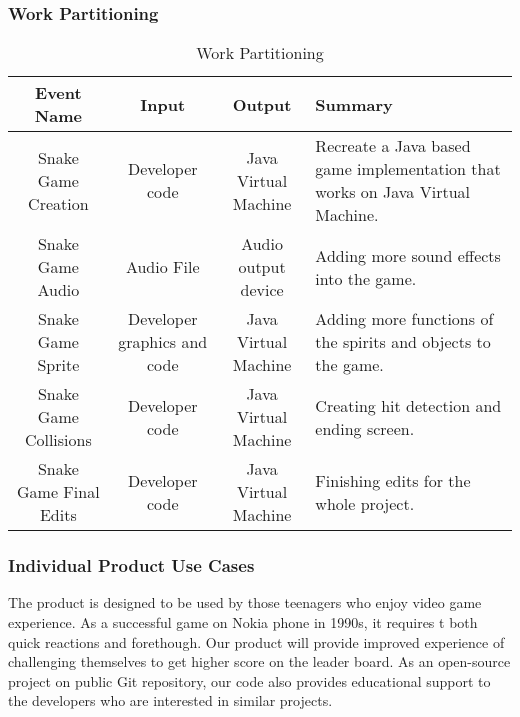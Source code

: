 \documentclass[12pt, titlepage]{article}
\begin{document}
\subsubsection{Work Partitioning}
	\begin{table}[H]
	\caption{Work Partitioning}
        \begin{adjustwidth}{-2.75cm}{}
    \begin{tabular}{|c|c|c|p{5cm}|}
    \hline
    Event Name & Input & Output & Summary\\
    \hline
    Snake Game Creation & Developer code & Java Virtual Machine & Recreate a Java based game implementation that works on Java Virtual Machine.\\
    \hline
    Snake Game Audio & Audio File & Audio output device & Adding more sound effects into the game.\\
    \hline
    Snake Game Sprite & Developer graphics and code & Java Virtual Machine & Adding more functions of the spirits and objects to the game.\\
    \hline
    Snake Game Collisions & Developer code & Java Virtual Machine & Creating hit detection and ending screen. \\
    \hline
    Snake Game Final Edits & Developer code & Java Virtual Machine & Finishing edits for the whole project.\\
    \hline
    \end{tabular}
	    \end{adjustwidth}
	\end{table}
\subsubsection{Individual Product Use Cases}
The product is designed to be used by those teenagers who enjoy video game experience. As a successful game on Nokia phone in 1990s, it requires t both quick reactions and forethough. Our product will provide improved experience of challenging themselves to get higher score on the leader board. As an open-source project on public Git repository, our code also provides educational support to the developers who are interested in similar projects.
\end{document}
